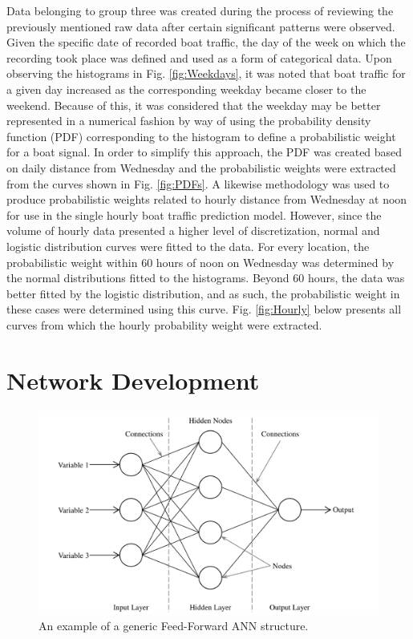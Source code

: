 \documentclass[
10pt, %
letterpaper, %
twoside, %
headinclude,footinclude, %
BCOR5mm, %
]{scrartcl}
\begin{document}
Data belonging to group three was created during the process of reviewing the previously mentioned raw data after certain significant patterns were observed. Given the specific date of recorded boat traffic, the day of the week on which the recording took place was defined and used as a form of categorical data. Upon observing the histograms in Fig. \ref{fig:Weekdays}, it was noted that boat traffic for a given day increased as the corresponding weekday became closer to the weekend. Because of this, it was considered that the weekday may be better represented in a numerical fashion by way of using the probability density function (PDF) corresponding to the histogram to define a probabilistic weight for a boat signal. In order to simplify this approach, the PDF was created based on daily distance from Wednesday and the probabilistic weights were extracted from the curves shown in Fig. \ref{fig:PDFs}. A likewise methodology was used to produce probabilistic weights related to hourly distance from Wednesday at noon for use in the single hourly boat traffic prediction model. However, since the volume of hourly data presented a higher level of discretization, normal and logistic distribution curves were fitted to the data. For every location, the probabilistic weight within 60 hours of noon on Wednesday was determined by the normal distributions fitted to the histograms. Beyond 60 hours, the data was better fitted by the logistic distribution, and as such, the probabilistic weight in these cases were determined using this curve. Fig. \ref{fig:Hourly} below presents all curves from which the hourly probability weight were extracted.

\section{Network Development}\label{sec:NetDev}

\begin{figure}[h!]
	\centering
	\includegraphics[width=0.95\linewidth]{figures/ANN_STRUCT.pdf} 
	\caption{An example of a generic Feed-Forward ANN structure.}
	\label{fig:ANN_STRUCT}
\end{figure}
\end{document}
